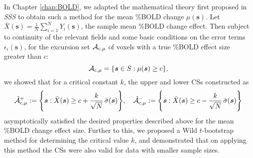 In Chapter \ref{chap:BOLD}, we adapted the mathematical theory first proposed in \textit{SSS} to obtain such a method for the mean \%BOLD change $\mu(\bm{s})$. Let $\bar{X}(\bm{s}) = \frac{1}{N}\sum_{i=1}^{N} Y_{i}(\bm{s})$, the sample mean \%BOLD change effect. Then subject to continuity of the relevant fields and some basic conditions on the error terms $\epsilon_{i}(\bm{s})$, for the excursion set $\operatorname{\mathcal{A}_{c,\mu}}$ of voxels with a true \%BOLD effect size greater than $c$:
\begin{equation}
\label{eq:mu_excursion}
\operatorname{\mathcal{A}_{c,\mu}} = \{\bm{s} \in S : \mu(\bm{s})\geq c \},
\end{equation}
we showed that for a critical constant $k$, the upper and lower CSs constructed as 
\begin{equation}
\label{eq:mu_CSs}
\operatorname{\hat{\mathcal{A}}_{c,\mu}^+} := \Bigg\{\bm{s} : \bar{X}(\bm{s}) \geq c + \frac{k}{\sqrt{N}}\, \hat{\sigma}(\bm{s}) \Bigg\}, \quad \operatorname{\hat{\mathcal{A}}_{c,\mu}^{\textrm{--}}} := \Bigg\{\bm{s} : \bar{X}(\bm{s}) \geq c - \frac{k}{{\sqrt{N}}} \,\hat{\sigma}(\bm{s}) \Bigg\}
\end{equation}
 asymptotically satisfied the desired properties described above for the mean \%BOLD change effect size. Further to this, we proposed a Wild $t$-bootstrap method for determining the critical value $k$, and demonstrated that on applying this method the CSs were also valid for data with smaller sample sizes.

